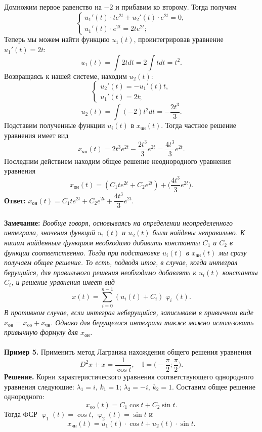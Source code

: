 \documentclass[a4paper, 12pt]{article}
\newcommand{\I}{\mathbb{I}}
\renewcommand{\varphi}{\upvarphi}
\begin{document}
Домножим первое равенство на $-2$ и прибавим ко второму. Тогда получим $$\begin{cases}
	u_1'(t)\cdot te^{2t} + u_2'(t)\cdot e^{2t} = 0,\\
	u_1'(t)\cdot e^{2t} = 2te^{2t};
\end{cases}$$
Теперь мы можем найти функцию $u_1(t)$, проинтегрировав уравнение $u_1'(t) = 2t$:
$$u_1(t)=\int2tdt = 2\int tdt = t^2.$$
Возвращаясь к нашей системе, находим $u_2(t)$: $$\begin{cases}
	u_2'(t) = -u_1'(t)t,\\
	u_1'(t) = 2t;
\end{cases}$$
$$u_2(t) = \int(-2)t^2dt = -\dfrac{2t^3}{3}.$$
Подставим полученные функции $u_i(t)$ в $x_\text{чн}(t)$. Тогда частное решение уравнения имеет вид $$x_\text{чн}(t) =  2t^3e^{2t} -\dfrac{2t^3}{3}e^{2t} = \dfrac{4t^3}{3}e^{2t}.$$
Последним действием находим общее решение неоднородного уравнения уравнения $$x_\text{он}(t) = (C_1te^{2t} + C_2e^{2t}) + \Big( \dfrac{4t^3}{3}e^{2t}\Big).$$
\textbf{Ответ:} $x_\text{он}(t) = C_1te^{2t} + C_2e^{2t} +  \dfrac{4t^3}{3}e^{2t}.$\\\\
\textbf{Замечание:} \textit{Вообще говоря, основываясь на определении неопределенного интеграла, значения функций $u_1(t)$ и $u_2(t)$ были найдены неправильно. К нашим найденным функциям необходимо добавить константы $C_1$ и $C_2$ в функции соответственно. Тогда при подстановке $u_i(t)$ в $x_\textbf{чн}(t)$ мы сразу получаем общее решение. То есть, подводя итог, в случае, когда интеграл берущийся, для правильного решения необходимо добавлять к $u_i(t)$ константы $C_i$, и решение уравнения имеет вид $$x(t) = \sum_{i = 0}^{n-1}(u_i(t) + C_i)\varphi_i(t).$$ В противном случае, если интеграл неберущийся, записываем в привычном виде $x_\text{он} = x_\text{oo} + x_\text{чн}.$ Однако для берущегося интеграла также можно использовать привычную формулу для $x_\text{он}$.}\\\\
\textbf{Пример 5.} Применить метод Лагранжа нахождения общего решения уравнения $$D^2x + x = \dfrac{1}{\cos t},\quad \I = \Big(-\dfrac{\pi}{2}; \dfrac{\pi}{2}\Big).$$
\textbf{Решение.} Корни характеристического уравнения соответствующего однородного уравнения следующие: $\lambda_1 = i$, $k_1 = 1$; $\lambda_2 = -i$, $k_2 = 1$. Составим общее решение однородного: $$x_\text{oo}(t) = {C}_1\cos t + {C}_2\sin t.$$
Тогда ФСР $\varphi_1(t) = \cos t$, $\varphi_2(t) = \sin t$ и $$x_\text{чн}(t) = u_1(t)\cdot \cos t + u_2(t)\cdot \sin t.$$
\end{document}
